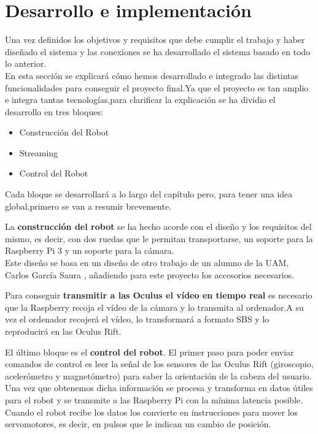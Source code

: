 \documentclass[twoside, 11pt]{epstfg}
\begin{document}
\chapter{Desarrollo e implementación}

Una vez definidos los objetivos y requisitos que debe cumplir el trabajo y haber diseñado el sistema y las conexiones se ha desarrollado el sistema basado en todo lo anterior.\\
En esta sección se explicará cómo hemos desarrollado e integrado las distintas funcionalidades para conseguir el proyecto final.Ya que el proyecto es tan amplio e integra tantas tecnologías,para clarificar la explicación se ha dividio el desarrollo en tres bloques:
\begin{itemize}
	\item Construcción del Robot
	\item Streaming 
	\item Control del Robot
\end{itemize}
Cada bloque se desarrollará a lo largo del capítulo pero, para tener una idea global,primero se van a resumir brevemente.

La \textbf{construcción del robot} se ha hecho acorde con el diseño y los requisitos del mismo, es decir, con dos ruedas que le permitan transportarse, un soporte para la Raspberry Pi 3 y un soporte para la cámara.\\
Este diseño se basa en un diseño de otro trabajo de un alumno de la UAM, Carlos García Saura \cite{garcia2012low}, añadiendo para este proyecto los accesorios necesarios.

Para conseguir \textbf{transmitir a las Oculus el vídeo en tiempo real} es necesario que la Raspberry recoja el vídeo de la cámara y lo transmita al ordenador.A su vez el ordenador recojerá el vídeo, lo transformará a formato SBS y lo reproducirá en las Oculus Rift. 

El último bloque es el \textbf{control del robot}. El primer paso para poder enviar comandos de control es leer la señal de los sensores de las Oculus Rift (giroscopio, acelerómetro y magnetómetro) para saber la orientación de la cabeza del usuario.\\
Una vez que obtenemos dicha información se procesa y transforma en datos útiles para el robot y se transmite a las Raspberry Pi con la mínima latencia posible.\\
Cuando el robot recibe los datos los convierte en instrucciones para mover los servomotores, es decir, en pulsos que le indican un cambio de posición.
	
\end{document}
